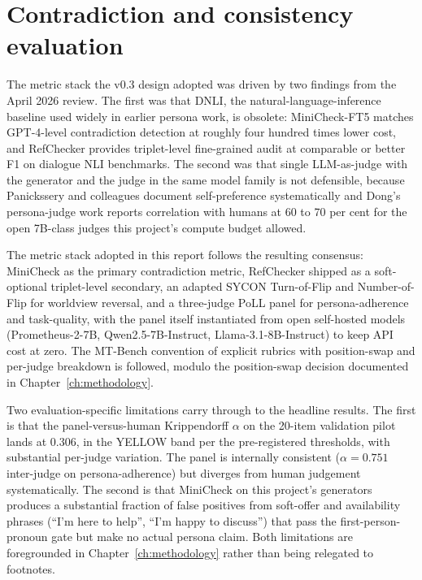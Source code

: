 \section{Contradiction and consistency evaluation}

The metric stack the v0.3 design adopted was driven by two findings from the April 2026 review. The first was that DNLI, the natural-language-inference baseline used widely in earlier persona work, is obsolete: MiniCheck-FT5 matches GPT-4-level contradiction detection at roughly four hundred times lower cost\autocite{minicheck2024}, and RefChecker provides triplet-level fine-grained audit at comparable or better F1 on dialogue NLI benchmarks\autocite{refchecker2024}. The second was that single LLM-as-judge with the generator and the judge in the same model family is not defensible, because Panickssery and colleagues document self-preference systematically\autocite{panickssery2024selfpref} and Dong's persona-judge work reports correlation with humans at 60 to 70 per cent for the open 7B-class judges this project's compute budget allowed\autocite{dong2024personajudge}.

The metric stack adopted in this report follows the resulting consensus: MiniCheck as the primary contradiction metric, RefChecker shipped as a soft-optional triplet-level secondary, an adapted SYCON Turn-of-Flip and Number-of-Flip for worldview reversal\autocite{sycon2025}, and a three-judge PoLL panel\autocite{poll2024} for persona-adherence and task-quality, with the panel itself instantiated from open self-hosted models (Prometheus-2-7B\autocite{prometheus2024}, Qwen2.5-7B-Instruct, Llama-3.1-8B-Instruct\autocite{llama3-2024}) to keep API cost at zero. The MT-Bench convention of explicit rubrics with position-swap and per-judge breakdown is followed\autocite{mtbench2023}, modulo the position-swap decision documented in Chapter~\ref{ch:methodology}.

Two evaluation-specific limitations carry through to the headline results. The first is that the panel-versus-human Krippendorff $\alpha$ on the 20-item validation pilot lands at 0.306, in the YELLOW band per the pre-registered thresholds, with substantial per-judge variation\autocite{krippendorff2011}. The panel is internally consistent ($\alpha = 0.751$ inter-judge on persona-adherence) but diverges from human judgement systematically. The second is that MiniCheck on this project's generators produces a substantial fraction of false positives from soft-offer and availability phrases (``I'm here to help'', ``I'm happy to discuss'') that pass the first-person-pronoun gate but make no actual persona claim. Both limitations are foregrounded in Chapter~\ref{ch:methodology} rather than being relegated to footnotes.

